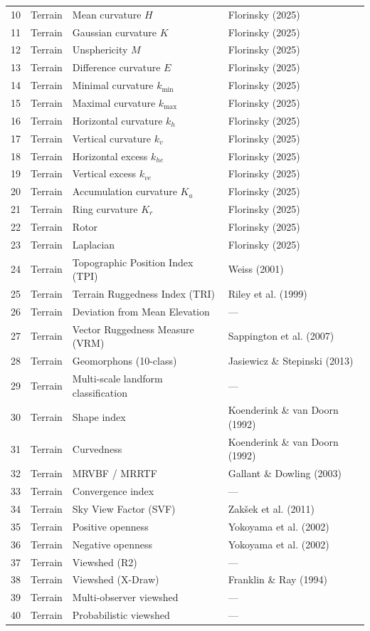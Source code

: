 \documentclass[11pt]{article}
\begin{document}
\begin{longtable}{@{}clp{5.5cm}p{4.5cm}@{}}
10 & Terrain & Mean curvature $H$ & Florinsky (2025) \\
11 & Terrain & Gaussian curvature $K$ & Florinsky (2025) \\
12 & Terrain & Unsphericity $M$ & Florinsky (2025) \\
13 & Terrain & Difference curvature $E$ & Florinsky (2025) \\
14 & Terrain & Minimal curvature $k_{\min}$ & Florinsky (2025) \\
15 & Terrain & Maximal curvature $k_{\max}$ & Florinsky (2025) \\
16 & Terrain & Horizontal curvature $k_h$ & Florinsky (2025) \\
17 & Terrain & Vertical curvature $k_v$ & Florinsky (2025) \\
18 & Terrain & Horizontal excess $k_{he}$ & Florinsky (2025) \\
19 & Terrain & Vertical excess $k_{ve}$ & Florinsky (2025) \\
20 & Terrain & Accumulation curvature $K_a$ & Florinsky (2025) \\
21 & Terrain & Ring curvature $K_r$ & Florinsky (2025) \\
22 & Terrain & Rotor & Florinsky (2025) \\
23 & Terrain & Laplacian & Florinsky (2025) \\

24 & Terrain & Topographic Position Index (TPI) & Weiss (2001) \\
25 & Terrain & Terrain Ruggedness Index (TRI) & Riley et al. (1999) \\
26 & Terrain & Deviation from Mean Elevation & --- \\
27 & Terrain & Vector Ruggedness Measure (VRM) & Sappington et al. (2007) \\
28 & Terrain & Geomorphons (10-class) & Jasiewicz \& Stepinski (2013) \\
29 & Terrain & Multi-scale landform classification & --- \\
30 & Terrain & Shape index & Koenderink \& van Doorn (1992) \\
31 & Terrain & Curvedness & Koenderink \& van Doorn (1992) \\
32 & Terrain & MRVBF / MRRTF & Gallant \& Dowling (2003) \\
33 & Terrain & Convergence index & --- \\

34 & Terrain & Sky View Factor (SVF) & Zakšek et al. (2011) \\
35 & Terrain & Positive openness & Yokoyama et al. (2002) \\
36 & Terrain & Negative openness & Yokoyama et al. (2002) \\
37 & Terrain & Viewshed (R2) & --- \\
38 & Terrain & Viewshed (X-Draw) & Franklin \& Ray (1994) \\
39 & Terrain & Multi-observer viewshed & --- \\
40 & Terrain & Probabilistic viewshed & --- \\


\end{longtable}
\end{document}
